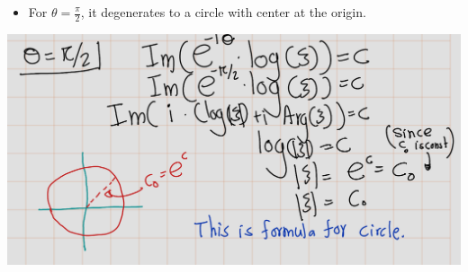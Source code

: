 \documentclass[
]{book}
\providecommand{\tightlist}{%
  \setlength{\itemsep}{0pt}\setlength{\parskip}{0pt}}
\theoremstyle{definition}
\theoremstyle{definition}
\theoremstyle{definition}
\theoremstyle{definition}
\theoremstyle{remark}
\begin{document}
\begin{itemize}
\tightlist
\item
  For \(\theta = \frac{\pi}{2}\), it degenerates to a circle with center at the origin.
\end{itemize}

\begin{center}\includegraphics[width=20.99in]{figures/Helical_Domain/fig3} \end{center}

  
\end{document}
